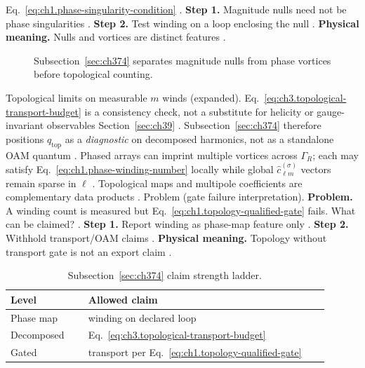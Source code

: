 Eq.~\eqref{eq:ch1.phase-singularity-condition} \cite{allen1992}.
\textbf{Step 1.} Magnitude nulls need not be phase singularities \cite{jackson1999}.
\textbf{Step 2.} Test winding on a loop enclosing the null \cite{allen1992}.
\textbf{Physical meaning.} Nulls and vortices are distinct features \cite{harrington2001}.
\begin{figure}[t]
\centering
{}
\caption{Subsection~\ref{sec:ch374} separates magnitude nulls from phase vortices before topological counting.}
\label{fig:ch3.374-null-vs-vortex}
\end{figure}
Topological limits on measurable \(m\) winds (expanded). Eq.~\eqref{eq:ch3.topological-transport-budget} is a consistency check, not a substitute for helicity or gauge-invariant
observables Section~\ref{sec:ch39} \cite{belinfante1940}. Subsection~\ref{sec:ch374} therefore positions
\(q_{\mathrm{top}}\) as a \emph{diagnostic} on decomposed harmonics, not as a standalone OAM quantum \cite{harrington2001}.
Phased arrays can imprint multiple vortices across \(\Gamma_R\); each may satisfy Eq.~\eqref{eq:ch1.phase-winding-number} locally
while global \(\widehat{c}_{\ell m}^{(\sigma)}\) vectors remain sparse in \(\ell\) \cite{allen1992}.
Topological maps and multipole coefficients are complementary data products \cite{hansen1988}.
Problem (gate failure interpretation). \textbf{Problem.} A winding count is measured but Eq.~\eqref{eq:ch1.topology-qualified-gate} fails. What can be claimed?
\cite{belinfante1940}.
\textbf{Step 1.} Report winding as phase-map feature only \cite{allen1992}.
\textbf{Step 2.} Withhold transport/OAM claims \cite{belinfante1940}.
\textbf{Physical meaning.} Topology without transport gate is not an export claim \cite{stratton1941}.
\begin{table}[t]
\centering
\caption{Subsection~\ref{sec:ch374} claim strength ladder.}
\label{tab:ch3.374-claim-ladder}
\small
\begin{tabular}{@{}p{0.22\linewidth}p{0.68\linewidth}@{}}
\toprule
Level & Allowed claim \\
\midrule
Phase map & winding on declared loop \\
Decomposed & Eq.~\eqref{eq:ch3.topological-transport-budget} \\
Gated & transport per Eq.~\eqref{eq:ch1.topology-qualified-gate} \\
\bottomrule
\end{tabular}
\end{table}
